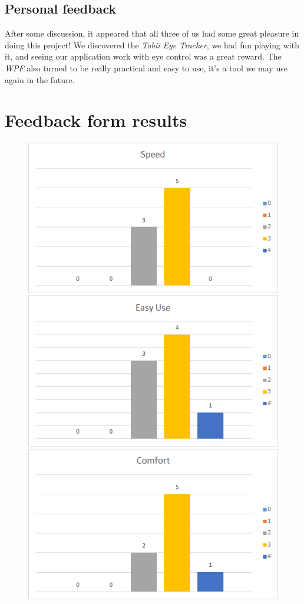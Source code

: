 \documentclass[12pt, a4paper]{article}
\begin{document}
\subsection{Personal feedback}
After some discussion, it appeared that all three of us had some great pleasure in doing this project! We discovered the \textit{Tobii Eye Tracker}, we had fun playing with it, and seeing our application work with eye control was a great reward. The \textit{WPF} also turned to be really practical and easy to use, it's a tool we may use again in the future. \\
\newpage
\appendix
\section{Feedback form results}
\label{FormResults}
\begin{figure}[H]
\includegraphics[scale =.59]{Speed}
\includegraphics[scale =.59]{EaseOfUse}
\includegraphics[scale =.59]{Comfort}

\end{figure}
\end{document}
